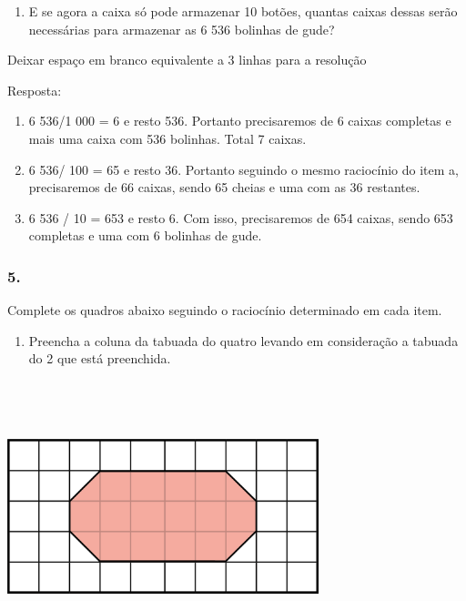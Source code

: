 \begin{enumerate}
\def\labelenumi{\alph{enumi})}
\item
  E se agora a caixa só pode armazenar 10 botões, quantas caixas dessas
  serão necessárias para armazenar as 6 536 bolinhas de gude?
\end{enumerate}

Deixar espaço em branco equivalente a 3 linhas para a resolução

Resposta:

\begin{enumerate}
\def\labelenumi{\alph{enumi})}
\item
  6 536/1 000 = 6 e resto 536. Portanto precisaremos de 6 caixas
  completas e mais uma caixa com 536 bolinhas. Total 7 caixas.
\item
  6 536/ 100 = 65 e resto 36. Portanto seguindo o mesmo raciocínio do
  item a, precisaremos de 66 caixas, sendo 65 cheias e uma com as 36
  restantes.
\item
  6 536 / 10 = 653 e resto 6. Com isso, precisaremos de 654 caixas,
  sendo 653 completas e uma com 6 bolinhas de gude.
\end{enumerate}

\subsubsection{5.}\label{section-17}

Complete os quadros abaixo seguindo o raciocínio determinado em cada
item.

\begin{enumerate}
\def\labelenumi{\alph{enumi})}
\item
  Preencha a coluna da tabuada do quatro levando em consideração a
  tabuada do 2 que está preenchida.
\end{enumerate}

\includegraphics[width=3.55833in,height=3.10173in]{media/image33.png}

